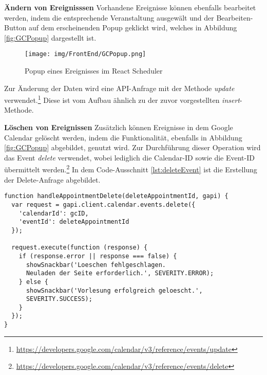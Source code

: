 \textbf{Ändern von Ereignisssen}\newline
Vorhandene Ereignisse können ebenfalls bearbeitet werden, indem die entsprechende Veranstaltung ausgewält und der Bearbeiten-Button auf dem erscheinenden Popup geklickt wird, welches in Abbildung \vref{fig:GCPopup} dargestellt ist. 
\begin{figure}[H]
	\centering 
	\texttt{[image: img/FrontEnd/GCPopup.png]}
	\caption[Popup eines Ereignisses im React Scheduler]{\label{fig:GCPopup}Popup eines Ereignisses im React Scheduler}
\end{figure}

Zur Änderung der Daten wird eine \ac{API}-Anfrage mit der Methode \textit{update} verwendet.\footnote{\url{https://developers.google.com/calendar/v3/reference/events/update}} 
Diese ist vom Aufbau ähnlich zu der zuvor vorgestellten \textit{insert}-Methode.

\textbf{Löschen von Ereignissen}\newline
Zusätzlich können Ereignisse in dem Google Calendar gelöscht werden, indem die Funktionalität, ebenfalls in Abbildung \vref{fig:GCPopup} abgebildet, genutzt wird. 
Zur Durchführung dieser Operation wird das Event \textit{delete} verwendet, wobei lediglich die Calendar-ID sowie die Event-ID übermittelt werden.\footnote{\url{https://developers.google.com/calendar/v3/reference/events/delete}}   
In dem Code-Ausschnitt \vref{lst:deleteEvent} ist die Erstellung der Delete-Anfrage abgebildet.

\lstset{language=JavaScript}
\begin{lstlisting}[caption={Anfrage zum Löschen eines Ereignisses}, label={lst:deleteEvent}]
function handleAppointmentDelete(deleteAppointmentId, gapi) {
  var request = gapi.client.calendar.events.delete({
    'calendarId': gcID,
    'eventId': deleteAppointmentId
  });

  request.execute(function (response) {
    if (response.error || response === false) {
      showSnackbar('Loeschen fehlgeschlagen. 
      Neuladen der Seite erforderlich.', SEVERITY.ERROR);
    } else {
      showSnackbar('Vorlesung erfolgreich geloescht.',
      SEVERITY.SUCCESS);
    }
  });
}
\end{lstlisting}

